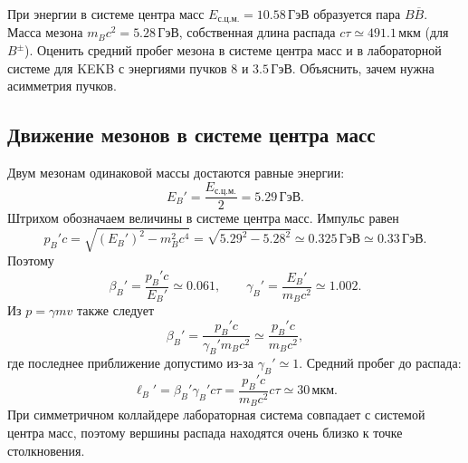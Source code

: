 \documentclass[../final.tex]{subfiles}
\begin{document}

\label{task:b_decay_length_sem5}

\condition
При энергии в системе центра масс $E_{\text{с.ц.м.}}=10.58\,\text{ГэВ}$
образуется пара $B\overline B$. Масса мезона $m_Bc^2=5.28\,\text{ГэВ}$,
собственная длина распада $c\tau\simeq491.1\,\text{мкм}$ (для $B^\pm$).
Оценить средний пробег мезона в системе центра масс и в лабораторной системе
для KEKB с энергиями пучков $8$ и $3.5\,\text{ГэВ}$.
Объяснить, зачем нужна асимметрия пучков.

\solution
\subsection*{Движение мезонов в системе центра масс}

Двум мезонам одинаковой массы достаются равные энергии:
\begin{equation*}
    E_B'=\frac{E_{\text{с.ц.м.}}}{2}=5.29\,\text{ГэВ}.
\end{equation*}
Штрихом обозначаем величины в системе центра масс. Импульс равен
\begin{equation*}
    p_B'c=\sqrt{(E_B')^2-m_B^2c^4}
    =\sqrt{5.29^2-5.28^2}\simeq0.325\,\text{ГэВ}
    \simeq0.33\,\text{ГэВ}.
\end{equation*}
Поэтому
\begin{equation*}
    \beta_B'=\frac{p_B'c}{E_B'}\simeq0.061,
    \qquad
    \gamma_B'=\frac{E_B'}{m_Bc^2}\simeq1.002.
\end{equation*}
Из $p=\gamma mv$ также следует
\begin{equation*}
    \beta_B'=\frac{p_B'c}{\gamma_B'm_Bc^2}
    \simeq\frac{p_B'c}{m_Bc^2},
\end{equation*}
где последнее приближение допустимо из-за $\gamma_B'\simeq1$.
Средний пробег до распада:
\begin{equation*}
    \ell_B'=\beta_B'\gamma_B'c\tau
    =\frac{p_B'c}{m_Bc^2}c\tau
    \simeq30\,\text{мкм}.
\end{equation*}
При симметричном коллайдере лабораторная система совпадает с системой
центра масс, поэтому вершины распада находятся очень близко к точке столкновения.
\end{document}

